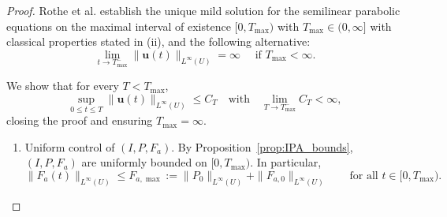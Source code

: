 \documentclass[pdflatex,sn-mathphys-ay]{sn-jnl}
\theoremstyle{thmstyleone}
\theoremstyle{definition}
\theoremstyle{remark}
\begin{document}
\begin{proof}
Rothe et al. establish the unique mild solution for the semilinear parabolic equations on the maximal interval of existence $[0,T_{\max})$ with $T_{\max}\in (0,\infty]$ with classical properties stated in (ii), and the following alternative:
\begin{equation}\label{eq:alternative}
    \lim_{t\to T_{\max}^-} \lVert \mathbf{u}(t)\rVert_{L^{\infty}(U)} = \infty \quad \text{ if } T_{\max} < \infty. 
\end{equation}

We show that for every $T<T_{\max}$,
\[
\sup_{0\le t\le T}\|\mathbf{u}(t)\|_{L^\infty(U)}\le C_T \quad \text{with} \quad \lim_{T\to T_{\max}^-} C_T <\infty,
\]
closing the proof and ensuring $T_{\max}=\infty$.

\begin{enumerate}[label=(\roman*)] 
\item Uniform control of $(I,P,F_a)$.
By Proposition~\ref{prop:IPA_bounds}, $(I,P,F_a)$ are uniformly bounded on $[0,T_{\max})$. In particular,
\begin{equation}
\label{eq:Famx_def}
\|F_a(t)\|_{L^\infty(U)}\le F_{a,\max}:=\|P_0\|_{L^\infty(U)}+\|F_{a,0}\|_{L^\infty(U)}
\qquad \text{for all }t\in[0,T_{\max}).
\end{equation}


\end{enumerate}
\end{proof}
\end{document}
